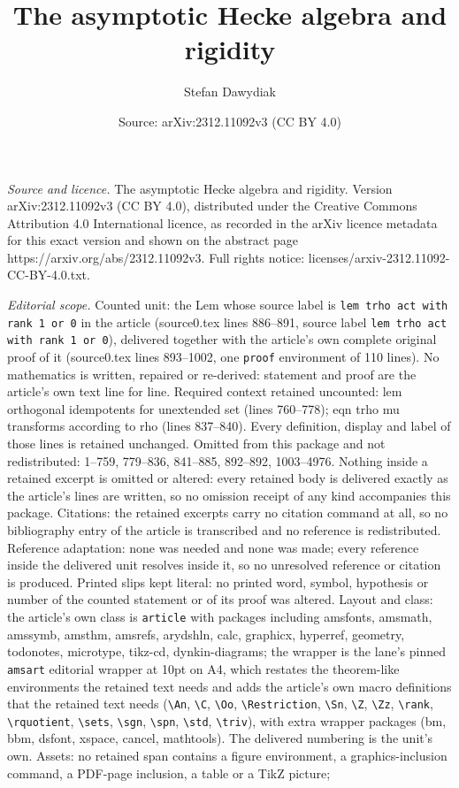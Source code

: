 \documentclass[10pt,a4paper]{amsart}
\title[The asymptotic Hecke algebra and rigidity]{The asymptotic Hecke algebra and rigidity}
\author{Stefan Dawydiak}
\date{Source: arXiv:2312.11092v3 (CC BY 4.0)}
\begin{document}
\maketitle

\noindent\emph{Source and licence.} The asymptotic Hecke algebra and rigidity. Version arXiv:2312.11092v3 (CC BY 4.0), distributed under the Creative Commons Attribution 4.0 International licence, as recorded in the arXiv licence metadata for this exact version and shown on the abstract page https://arxiv.org/abs/2312.11092v3. Full rights notice: licenses/arxiv-2312.11092-CC-BY-4.0.txt.\par\smallskip

\noindent\textit{Editorial scope.} Counted unit: the Lem whose source label is \texttt{lem trho act with rank 1 or 0} in the article (source0.tex lines 886--891, source label \texttt{lem trho act with rank 1 or 0}), delivered together with the article's own complete original proof of it (source0.tex lines 893--1002, one \texttt{proof} environment of 110 lines). No mathematics is written, repaired or re-derived: statement and proof are the article's own text line for line. Required context retained uncounted: lem orthogonal idempotents for unextended set (lines 760--778); eqn trho mu transforms according to rho (lines 837--840). Every definition, display and label of those lines is retained unchanged. Omitted from this package and not redistributed: 1--759, 779--836, 841--885, 892--892, 1003--4976. Nothing inside a retained excerpt is omitted or altered: every retained body is delivered exactly as the article's lines are written, so no omission receipt of any kind accompanies this package. Citations: the retained excerpts carry no citation command at all, so no bibliography entry of the article is transcribed and no reference is redistributed. Reference adaptation: none was needed and none was made; every reference inside the delivered unit resolves inside it, so no unresolved reference or citation is produced. Printed slips kept literal: no printed word, symbol, hypothesis or number of the counted statement or of its proof was altered. Layout and class: the article's own class is \texttt{article} with packages including amsfonts, amsmath, amssymb, amsthm, amsrefs, arydshln, calc, graphicx, hyperref, geometry, todonotes, microtype, tikz-cd, dynkin-diagrams; the wrapper is the lane's pinned \texttt{amsart} editorial wrapper at 10pt on A4, which restates the theorem-like environments the retained text needs and adds the article's own macro definitions that the retained text needs (\texttt{\textbackslash An}, \texttt{\textbackslash C}, \texttt{\textbackslash Oo}, \texttt{\textbackslash Restriction}, \texttt{\textbackslash Sn}, \texttt{\textbackslash Z}, \texttt{\textbackslash Zz}, \texttt{\textbackslash rank}, \texttt{\textbackslash rquotient}, \texttt{\textbackslash sets}, \texttt{\textbackslash sgn}, \texttt{\textbackslash spn}, \texttt{\textbackslash std}, \texttt{\textbackslash triv}), with extra wrapper packages (bm, bbm, dsfont, xspace, cancel, mathtools). The delivered numbering is the unit's own. Assets: no retained span contains a figure environment, a graphics-inclusion command, a PDF-page inclusion, a table or a TikZ picture; 
\end{document}
